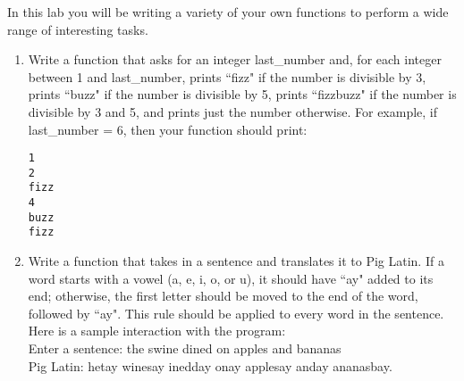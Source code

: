 \documentclass[11pt, letterpaper, onecolumn, oneside, final]{article}
\begin{document}
\maketitle
In this lab you will be writing a variety of your own functions to perform a wide range of interesting tasks.
\begin{enumerate}
\item Write a function that asks for an integer {\consolas last\_number} and, for each integer between 1 and {\consolas last\_number},
prints \textquotedblleft fizz" if the number is divisible by 3, prints \textquotedblleft buzz" if the number is divisible by 5, prints
\textquotedblleft fizzbuzz" if the number is divisible by 3 and 5, and prints just the number otherwise. For example,
if {\consolas last\_number} = 6, then your function should print:
\begin{lstlisting}
1
2
fizz
4
buzz
fizz
\end{lstlisting}



\item 
Write a function that takes in a sentence and translates it to Pig Latin. If a word starts with a vowel (a, e, i, o, or u), it should have \textquotedblleft ay" added to its end; otherwise, the first letter should be moved to the end of the word, followed by \textquotedblleft ay". This rule should be
applied to every word in the sentence.
Here is a sample interaction with the program:\\
{\consolas Enter a sentence: the swine dined on apples and bananas\\
Pig Latin: hetay winesay inedday onay applesay anday ananasbay}.



\end{enumerate}
\end{document}
